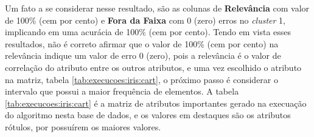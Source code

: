 %     
% 


Um fato a se considerar nesse resultado, são as colunas de \textbf{Relevância} com valor de 100\% (cem por cento) e \textbf{Fora da Faixa} com 0 (zero) erros no \textit{cluster} 1, implicando em uma acurácia de 100\% (cem por cento). Tendo em vista esses resultados, não é correto afirmar que o valor de   100\% (cem por cento) na relevância indique um valor de erro 0 (zero), pois a relevância é o valor de correlação do atributo entre os outros atributos, e uma vez escolhido o atributo na matriz, tabela \ref{tab:execucoes:iris:cart}, o próximo passo é considerar o intervalo que possui a maior frequência de elementos. A tabela \ref{tab:execucoes:iris:cart} é a matriz de atributos importantes gerado na execuação do algoritmo nesta base de dados, e os valores em destaques são os atributos rótulos, por possuírem os maiores valores.

